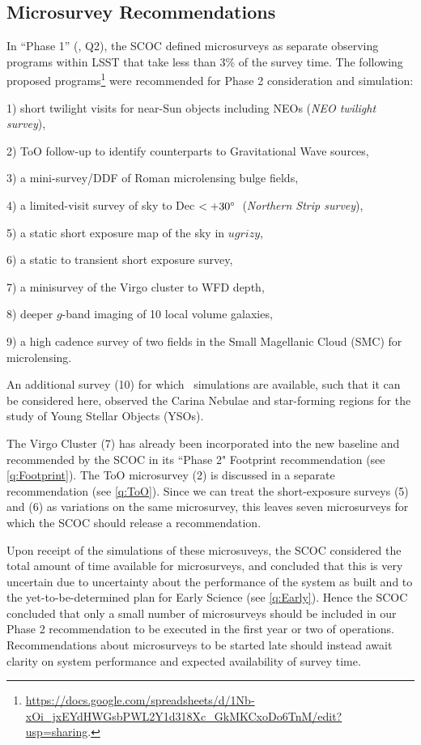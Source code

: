 \subsection{Microsurvey Recommendations}\label{q:Micro}


In ``Phase 1'' (, Q2), the SCOC  defined microsurveys as separate observing programs within LSST that take less than 3\% of the survey time. The following proposed programs\footnote{\url{https://docs.google.com/spreadsheets/d/1Nb-xOi_jxEYdHWGsbPWL2Y1d318Xc_GkMKCxoDo6TnM/edit?usp=sharing}.} were recommended for Phase 2 consideration and simulation:

1) short twilight visits for near-Sun objects including NEOs (\emph{NEO twilight survey}), 

2) ToO follow-up to identify counterparts to Gravitational Wave sources, 

3) a mini-survey/DDF of Roman microlensing bulge fields,

4) a limited-visit survey of sky to Dec $< +30^{\circ} $~(\emph{Northern Strip survey}),

5) a static short exposure map of the sky in $ugrizy$,

6) a static to transient short exposure survey, 

7) a minisurvey of the Virgo cluster to WFD depth, 

8) deeper $g$-band imaging of 10 local volume galaxies,

9) a high cadence survey of two fields in the Small Magellanic Cloud (SMC) for microlensing. 

An additional survey (10) for which \opsim\ simulations are available, such that it can be considered here, observed the Carina Nebulae and star-forming regions for the study of Young Stellar Objects (YSOs).  

The Virgo Cluster (7) has already been incorporated into the new baseline and recommended by the SCOC in its ``Phase 2" Footprint recommendation (see \autoref{q:Footprint}). The ToO microsurvey (2) is discussed in a separate recommendation (see \autoref{q:ToO}). 
Since we can treat the short-exposure surveys (5) and (6) as variations on the same microsurvey, this leaves seven microsurveys for which the SCOC should release a recommendation.

Upon receipt of the simulations of these microsuveys, the SCOC considered the total amount of time available for microsurveys, and concluded that this is very uncertain due to uncertainty about the performance of the system as built and to the yet-to-be-determined plan for Early Science (see \autoref{q:Early}). Hence the SCOC concluded that only a small number of microsurveys should be included in our Phase 2 recommendation to be executed in the first year or two of operations. Recommendations about microsurveys to be started late should instead await clarity on system performance and expected availability of survey time. 

